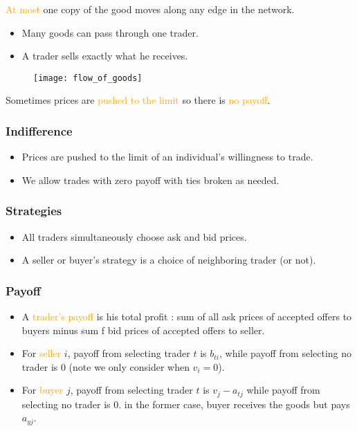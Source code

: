 \textcolor{orange}{At most} one copy of the good moves along any edge in the network.

\begin{itemize}
\item Many goods can pass through one trader.
\item A trader sells exactly what he receives.
\end{itemize}

\begin{figure}[H]
    \centering
    \texttt{[image: flow\_of\_goods]}
\end{figure}

Sometimes prices are \textcolor{orange}{pushed to the limit} so there is \textcolor{orange}{no payoff}.

\subsubsection{Indifference}

\begin{itemize}
\item Prices are pushed to the limit of an individual's willingness to trade.
\item We allow trades with zero payoff with ties broken as needed.
\end{itemize}

\subsubsection{Strategies}

\begin{itemize}
\item All traders simultaneously choose ask and bid prices.
\item A seller or buyer's strategy is a choice of neighboring trader (or not).
\end{itemize}

\subsubsection{Payoff}

\begin{itemize}
\item A \textcolor{orange}{trader's payoff} is his total profit : sum of all ask prices of accepted offers to buyers minus sum f bid prices of accepted offers to seller.
\item For \textcolor{orange}{seller} $i$, payoff from selecting trader $t$ is $b_{ti}$, while payoff from selecting no trader is $0$ (note we only consider when $v_i = 0$).
\item For \textcolor{orange}{buyer} $j$, payoff from selecting trader $t$ is $v_j - a_{tj}$ while payoff from selecting no trader is $0$. in the former case, buyer receives the goods but pays $a_{yj}$.
\end{itemize}

